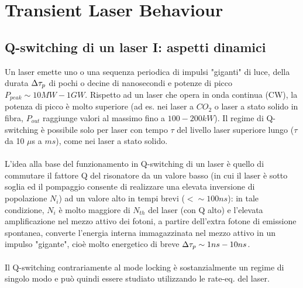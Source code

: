 \chapter{Transient Laser Behaviour}
\graphicspath{{./cap_6/images/}}

\section{Q-switching di un laser I: aspetti dinamici}
Un laser emette uno o una sequenza periodica di impulsi "giganti" di luce, della durata $\Delta\tau_p$ di pochi o decine di nanosecondi e potenze di picco $P_{peak} \sim 10 MW - 1 GW$.
Rispetto ad un laser che opera in onda continua (CW), la potenza di picco è molto superiore (ad es. nei laser a $CO_2$ o laser a stato solido in fibra, $P_{out}$ raggiunge valori al massimo fino a $100-200 kW$). Il regime di Q-switching è possibile solo per laser con tempo $\tau$ del livello laser superiore lungo ($\tau$ da 10 $\mu$s a $ms$), come nei laser a stato solido.\\
\\
L'idea alla base del funzionamento in Q-switching di un laser è quello di commutare il fattore Q del risonatore da un valore basso (in cui il laser è sotto soglia ed il pompaggio consente di realizzare una elevata inversione di popolazione $N_i$) ad un valore alto in tempi brevi ($< \sim 100 ns$): in tale condizione, $N_i$ è molto maggiore di $N_{th}$ del laser (con Q alto) e l'elevata amplificazione nel mezzo attivo dei fotoni, a partire dell'extra fotone di emissione spontanea, converte l'energia interna immagazzinata nel mezzo attivo in un impulso "gigante", cioè molto energetico di breve $\Delta\tau_p \sim 1 ns - 10 ns$.\\
\\
Il Q-switching contrariamente al mode locking è sostanzialmente un regime di singolo modo e può quindi essere studiato utilizzando le rate-eq. del laser.
